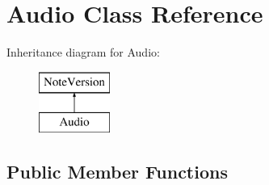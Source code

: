 \hypertarget{class_audio}{}\section{Audio Class Reference}
\label{class_audio}
Inheritance diagram for Audio\+:\begin{figure}[H]
\begin{center}
\leavevmode
\includegraphics[height=2.000000cm]{class_audio}
\end{center}
\end{figure}
\subsection*{Public Member Functions}
